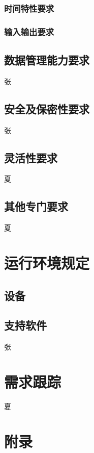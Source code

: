 \documentclass[UTF8]{ctexart}
\begin{document}
\subsubsection{时间特性要求}

\subsubsection{输入输出要求}

\subsection{数据管理能力要求}
张
\subsection{安全及保密性要求}
张
\subsection{灵活性要求}
夏
\subsection{其他专门要求}
夏
\section{运行环境规定}
\subsection{设备}

\subsection{支持软件}
张
\section{需求跟踪}
夏
\section{附录}
\end{document}
